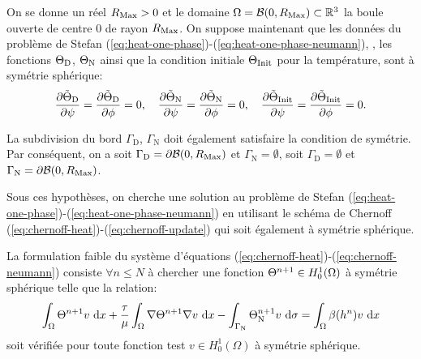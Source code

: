 On se donne un réel $R_\mathrm{Max} > 0$ et le domaine $\Omega = \mathcal B(0,
R_\mathrm{Max}) \subset \mathbb R^3$ la boule ouverte de centre $0$ de rayon
$R_\mathrm{Max}$. On suppose maintenant que les données du problème de Stefan
(\ref{eq:heat-one-phase})-(\ref{eq:heat-one-phase-neumann}), \ie, les
fonctions $\Theta_\mathrm{D}$, $\Theta_\mathrm{N}$ ainsi
que la condition initiale $\Theta_\text{Init}$ pour la température, sont à
symétrie sphérique:
\begin{align}
  \frac{\partial \tilde {\Theta}_{\mathrm{D}}}{\partial \psi} = \frac{\partial \tilde {\Theta}_{\mathrm{D}}}{\partial \phi} = 0,\quad
  \frac{\partial \tilde {\Theta}_{\mathrm{N}}}{\partial \psi} = \frac{\partial \tilde {\Theta}_{\mathrm{N}}}{\partial \phi} = 0,\quad
  \frac{\partial \tilde{\Theta}_\text{Init}}{\partial \psi} = \frac{\partial \tilde{\Theta}_\text{Init}}{\partial \phi} = 0.
\end{align}

La subdivision du bord $\Gamma_\mathrm{D}$, $\Gamma_\mathrm{N}$ doit
également satisfaire la condition de symétrie. Par conséquent, on a
soit $\Gamma_\mathrm{D} = \partial\mathcal B(0,R_\mathrm{Max})$ et
$\Gamma_\mathrm{N} = \emptyset$, soit $\Gamma_\mathrm{D} = \emptyset$
et $\Gamma_\mathrm{N} = \partial\mathcal B(0,R_\mathrm{Max})$.

Sous ces hypothèses, on cherche une solution au problème de Stefan
(\ref{eq:heat-one-phase})-(\ref{eq:heat-one-phase-neumann}) en
utilisant le schéma de Chernoff
(\ref{eq:chernoff-heat})-(\ref{eq:chernoff-update}) qui soit également
à symétrie sphérique.

La formulation faible du système d'équations
(\ref{eq:chernoff-heat})-(\ref{eq:chernoff-neumann}) consiste $\forall
n\leq N$ à chercher une fonction $\Theta^{n+1}\in H_0^1(\Omega)$
à symétrie sphérique telle que la relation:
\begin{equation}\label{eq:weak-form-cart-coord}
  \int_\Omega \temperature^{n+1} v\,\intd{x} + \frac{\tau}{\mu} %
  \int_\Omega \nabla \temperature^{n+1} \nabla v\,\intd{x} - %
  \int_{\Gamma_\mathrm{N}} \temperature^{n+1}_\mathrm{N} v\,\intd{\sigma} %
  = \int_\Omega \beta(\enthalpydensity^n)v\,\intd{x}
\end{equation}
soit vérifiée pour toute fonction test $v\in H_0^1(\Omega)$ à symétrie
sphérique.

